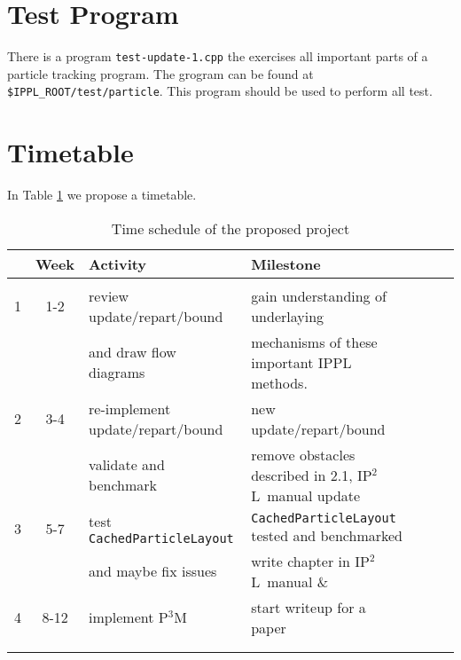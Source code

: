 \documentclass[10pt,a4paper]{scrartcl}
\newcommand{\ippl}{\textsc{IP$^2$L}}
\begin{document}
\section{Test Program}
There is a program {\tt test-update-1.cpp} the exercises all important parts of a particle tracking program. The grogram can be found at 
{\tt \$IPPL\_ROOT/test/particle}. This program should be used to perform all test.


\section{Timetable}

In Table \ref{tbl:time} we propose a timetable.

\begin{table}[ht]\footnotesize
\begin{center}  
\begin{tabular}{lclllll} 
\hline 
\bf & \bf Week  & \bf Activity & \bf Milestone  \\
\hline \\
1 & 1-2 & review update/repart/bound  & gain understanding of underlaying \\
  &     & and draw flow diagrams      & mechanisms of these important IPPL methods. \\
2 & 3-4 & re-implement update/repart/bound  & new update/repart/bound \\
  &     & validate and benchmark      &  remove obstacles described in 2.1, \ippl~manual update\\
3 & 5-7 & test \texttt{CachedParticleLayout}  &  \texttt{CachedParticleLayout} tested and benchmarked \\
  &     & and maybe fix issues     &  write chapter in \ippl~manual \&\\
4 & 8-12 & implement  P$^3$M & start writeup for a paper \\
  &     &      &  \\
\\
\hline 
\end{tabular} 
\caption{Time schedule of the proposed project}
\label{tbl:time}
\end{center}
\end{table}
\end{document}
